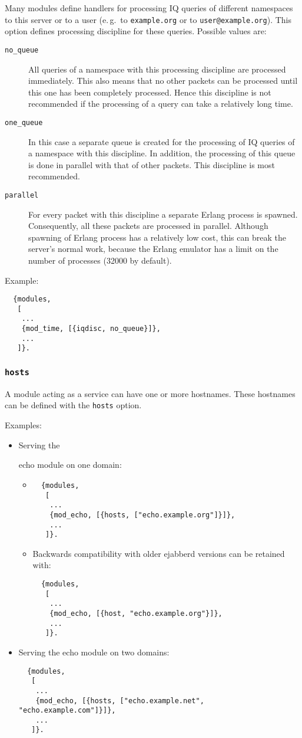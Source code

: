 \documentclass[a4paper,10pt]{article}
\newcommand{\ind}[1]{\begin{latexonly}\index{#1}\end{latexonly}}
\newcommand{\bracehack}{\def\{{\char"7B}\def\}{\char"7D}}
\newcommand{\titem}[1]{\item[\bracehack\texttt{#1}]}
\newcommand{\jid}[1]{\texttt{#1}}
\newcommand{\option}[1]{\texttt{#1}}
\newcommand{\module}[1]{\texttt{#1}}
\newcommand{\modecho}{\module{mod\_echo}}
\begin{document}
Many modules define handlers for processing IQ queries of different namespaces
to this server or to a user (e.\,g.\ to \jid{example.org} or to
\jid{user@example.org}). This option defines processing discipline for
these queries. Possible values are:
\begin{description}
\titem{no\_queue} All queries of a namespace with this processing discipline are
  processed immediately. This also means that no other packets can be processed
  until this one has been completely processed. Hence this discipline is not
  recommended if the processing of a query can take a relatively long time.
\titem{one\_queue} In this case a separate queue is created for the processing
  of IQ queries of a namespace with this discipline. In addition, the processing
  of this queue is done in parallel with that of other packets. This discipline
  is most recommended.
\titem{parallel} For every packet with this discipline a separate Erlang process
  is spawned. Consequently, all these packets are processed in parallel.
  Although spawning of Erlang process has a relatively low cost, this can break
  the server's normal work, because the Erlang emulator has a limit on the
  number of processes (32000 by default).
\end{description}

Example:
\begin{verbatim}
  {modules,
   [
    ...
    {mod_time, [{iqdisc, no_queue}]},
    ...
   ]}.
\end{verbatim}

\subsubsection{\option{hosts}}
\label{sec:modhostsoption}
\ind{options!hosts}

A module acting as a service can have one or more hostnames. These hostnames
can be defined with the \option{hosts} option.

Examples:
\begin{itemize}
\item Serving the \ind{modules!\modecho{}}echo module on one domain:
  \begin{itemize}
  \item
    \begin{verbatim}
  {modules,
   [
    ...
    {mod_echo, [{hosts, ["echo.example.org"]}]},
    ...
   ]}.
\end{verbatim}
  \item Backwards compatibility with older ejabberd versions can be retained
    with:
    \begin{verbatim}
  {modules,
   [
    ...
    {mod_echo, [{host, "echo.example.org"}]},
    ...
   ]}.
\end{verbatim}
  \end{itemize}
  \item Serving the echo module on two domains:
    \begin{verbatim}
  {modules,
   [
    ...
    {mod_echo, [{hosts, ["echo.example.net", "echo.example.com"]}]},
    ...
   ]}.
\end{verbatim}
\end{itemize}
\end{document}
